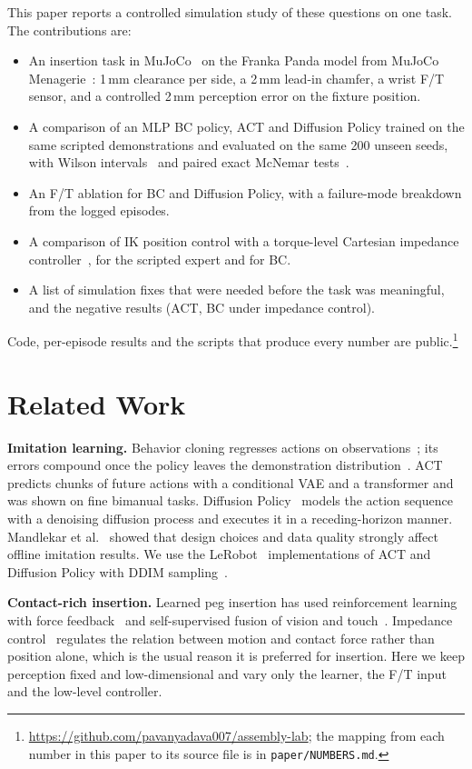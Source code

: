 \documentclass[conference]{IEEEtran}
\begin{document}
This paper reports a controlled simulation study of these questions on one task. The contributions are:
\begin{itemize}
\item An insertion task in MuJoCo~\cite{todorov2012mujoco} on the Franka Panda model from MuJoCo Menagerie~\cite{zakka2022menagerie}: 1\,mm clearance per side, a 2\,mm lead-in chamfer, a wrist F/T sensor, and a controlled 2\,mm perception error on the fixture position.
\item A comparison of an MLP BC policy, ACT and Diffusion Policy trained on the same scripted demonstrations and evaluated on the same 200 unseen seeds, with Wilson intervals~\cite{wilson1927} and paired exact McNemar tests~\cite{mcnemar1947}.
\item An F/T ablation for BC and Diffusion Policy, with a failure-mode breakdown from the logged episodes.
\item A comparison of IK position control with a torque-level Cartesian impedance controller~\cite{hogan1985impedance}, for the scripted expert and for BC.
\item A list of simulation fixes that were needed before the task was meaningful, and the negative results (ACT, BC under impedance control).
\end{itemize}
Code, per-episode results and the scripts that produce every number are public.\footnote{\url{https://github.com/pavanyadava007/assembly-lab}; the mapping from each number in this paper to its source file is in \texttt{paper/NUMBERS.md}.}

\section{Related Work}
\textbf{Imitation learning.} Behavior cloning regresses actions on observations~\cite{pomerleau1988alvinn}; its errors compound once the policy leaves the demonstration distribution~\cite{ross2011dagger}. ACT~\cite{zhao2023act} predicts chunks of future actions with a conditional VAE and a transformer and was shown on fine bimanual tasks. Diffusion Policy~\cite{chi2023diffusion} models the action sequence with a denoising diffusion process and executes it in a receding-horizon manner. Mandlekar et al.~\cite{mandlekar2021matters} showed that design choices and data quality strongly affect offline imitation results. We use the LeRobot~\cite{cadene2024lerobot} implementations of ACT and Diffusion Policy with DDIM sampling~\cite{song2021ddim}.

\textbf{Contact-rich insertion.} Learned peg insertion has used reinforcement learning with force feedback~\cite{inoue2017deep} and self-supervised fusion of vision and touch~\cite{lee2019vision}. Impedance control~\cite{hogan1985impedance} regulates the relation between motion and contact force rather than position alone, which is the usual reason it is preferred for insertion. Here we keep perception fixed and low-dimensional and vary only the learner, the F/T input and the low-level controller.
\end{document}

